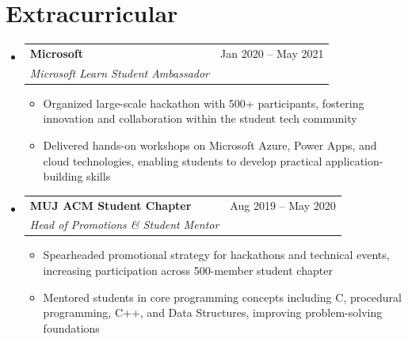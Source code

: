 \documentclass[letterpaper,11pt]{article}
\makeatletter
\newcommand{\resumeItem}[2]{
  \item{
    \textbf{#1}{: #2 \vspace{-2pt}}
  }
}
\newcommand{\resumeSubheading}[4]{
  \vspace{0pt}\item
    \begin{tabular*}{\textwidth}{l@{\extracolsep{\fill}}r}
      \textbf{#1} & #2 \\
      \textit{#3} & \textit{#4} \\ 
    \end{tabular*}\vspace{-6pt}
}
\newcommand{\resumeSubHeadingListStart}{\begin{itemize}[leftmargin=0pt,label={},itemsep=-2pt]}
\newcommand{\resumeSubHeadingListEnd}{\end{itemize}}
\newcommand{\resumeItemListStart}{\begin{itemize}[leftmargin=12pt, nosep, topsep=2pt]}
\newcommand{\resumeItemListEnd}{\end{itemize}}
\renewcommand{\resumeItem}[2]{
  \item {#2}
}
\makeatother
\begin{document}
\section{Extracurricular}
  \resumeSubHeadingListStart
    \resumeSubheading
      {Microsoft}{Jan 2020 -- May 2021}
      {Microsoft Learn Student Ambassador}{}
      \resumeItemListStart
        \resumeItem{Community Leadership}
          {Organized large-scale hackathon with 500+ participants, fostering innovation and collaboration within the student tech community}
        \resumeItem{Technical Education}
          {Delivered hands-on workshops on Microsoft Azure, Power Apps, and cloud technologies, enabling students to develop practical application-building skills}
      \resumeItemListEnd
    \resumeSubheading
      {MUJ ACM Student Chapter}{Aug 2019 -- May 2020}
      {Head of Promotions \& Student Mentor}{}
      \resumeItemListStart
        \resumeItem{Strategic Outreach}
          {Spearheaded promotional strategy for hackathons and technical events, increasing participation across 500-member student chapter}
        \resumeItem{Technical Mentorship}
          {Mentored students in core programming concepts including C, procedural programming, C++, and Data Structures, improving problem-solving foundations}
      \resumeItemListEnd
  \resumeSubHeadingListEnd
\end{document}
